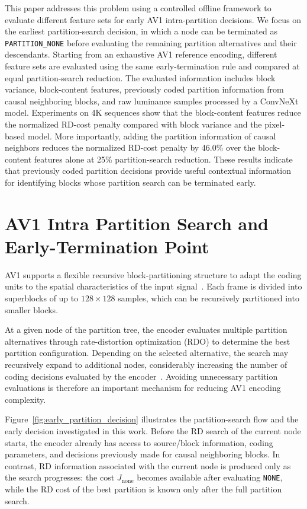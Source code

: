 \documentclass{article}
\begin{document}
This paper addresses this problem using a controlled offline framework to evaluate different feature sets for early AV1 intra-partition decisions. We focus on the earliest partition-search decision, in which a node can be terminated as \texttt{PARTITION\_NONE} before evaluating the remaining partition alternatives and their descendants. Starting from an exhaustive AV1 reference encoding, different feature sets are evaluated using the same early-termination rule and compared at equal partition-search reduction. The evaluated information includes block variance, block-content features, previously coded partition information from causal neighboring blocks, and raw luminance samples processed by a ConvNeXt model. Experiments on 4K sequences show that the block-content features reduce the normalized RD-cost penalty compared with block variance and the pixel-based model. More importantly, adding the partition information of causal neighbors reduces the normalized RD-cost penalty by 46.0\% over the block-content features alone at 25\% partition-search reduction. These results indicate that previously coded partition decisions provide useful contextual information for identifying blocks whose partition search can be terminated early.

\section{AV1 Intra Partition Search and Early-Termination Point}

AV1 supports a flexible recursive block-partitioning structure to adapt the coding units to the spatial characteristics of the input signal~\cite{han2021av1overview,chen2018av1tools}. Each frame is divided into superblocks of up to $128\times128$ samples, which can be recursively partitioned into smaller blocks.

At a given node of the partition tree, the encoder evaluates multiple partition alternatives through rate-distortion optimization (RDO) to determine the best partition configuration. Depending on the selected alternative, the search may recursively expand to additional nodes, considerably increasing the number of coding decisions evaluated by the encoder~\cite{bender2023av1complexity}. Avoiding unnecessary partition evaluations is therefore an important mechanism for reducing AV1 encoding complexity.

Figure~\ref{fig:early_partition_decision} illustrates the partition-search flow and the early decision investigated in this work. Before the RD search of the current node starts, the encoder already has access to source/block information, coding parameters, and decisions previously made for causal neighboring blocks. In contrast, RD information associated with the current node is produced only as the search progresses: the cost $J_{\mathrm{none}}$ becomes available after evaluating \texttt{NONE}, while the RD cost of the best partition is known only after the full partition search.
\end{document}
